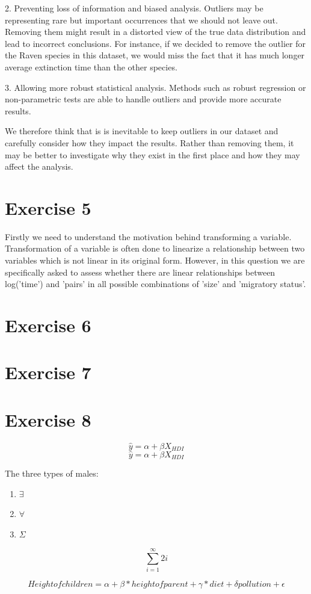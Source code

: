 \documentclass{article}
\begin{document}
2. Preventing loss of information and biased analysis. Outliers may be representing rare but important occurrences that we should not leave out. Removing them might result in a distorted view of the true data distribution and lead to incorrect conclusions. For instance, if we decided to remove the outlier for the Raven species in this dataset, we would miss the fact that it has much longer average extinction time than the other species.

3. Allowing more robust statistical analysis. Methods such as robust regression or non-parametric tests are able to handle outliers and provide more accurate results.

We therefore think that is is inevitable to keep outliers in our dataset and carefully consider how they impact the results. Rather than removing them, it may be better to investigate why they exist in the first place and how they may affect the analysis.


\section{Exercise 5}
Firstly we need to understand the motivation behind transforming a variable. Transformation of a variable is often done to linearize a relationship between two variables which is not linear in its original form. However, in this question we are specifically asked to assess whether there are linear relationships between log('time') and 'pairs' in all possible combinations of 'size' and 'migratory status'.


\section{Exercise 6}

\section{Exercise 7}

\section{Exercise 8}


\begin{equation}
    \hat{y} = \alpha + \beta X_{HDI}
\end{equation}
$$\hat{y} = \alpha + \beta X_{HDI}$$

The three types of males:
\begin{enumerate}
    \item $\exists$
    \item $\forall$
    \item $\Sigma$
\end{enumerate}

$$\sum_{i=1} ^{\infty}{2i}$$


$$Height of children = \alpha + \beta *{height of parent} + \gamma *{diet} + \delta{pollution} + \epsilon$$
\end{document}
